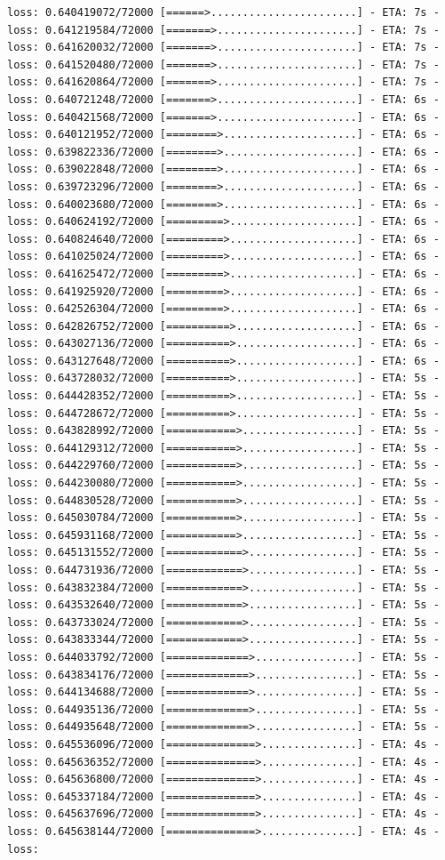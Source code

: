 \documentclass[12pt,fleqn]{article}\usepackage{../../common}
\begin{document}
\begin{verbatim}
loss: 0.640419072/72000 [======>.......................] - ETA: 7s - loss: 0.641219584/72000 [=======>......................] - ETA: 7s - loss: 0.641620032/72000 [=======>......................] - ETA: 7s - loss: 0.641520480/72000 [=======>......................] - ETA: 7s - loss: 0.641620864/72000 [=======>......................] - ETA: 7s - loss: 0.640721248/72000 [=======>......................] - ETA: 6s - loss: 0.640421568/72000 [=======>......................] - ETA: 6s - loss: 0.640121952/72000 [========>.....................] - ETA: 6s - loss: 0.639822336/72000 [========>.....................] - ETA: 6s - loss: 0.639022848/72000 [========>.....................] - ETA: 6s - loss: 0.639723296/72000 [========>.....................] - ETA: 6s - loss: 0.640023680/72000 [========>.....................] - ETA: 6s - loss: 0.640624192/72000 [=========>....................] - ETA: 6s - loss: 0.640824640/72000 [=========>....................] - ETA: 6s - loss: 0.641025024/72000 [=========>....................] - ETA: 6s - loss: 0.641625472/72000 [=========>....................] - ETA: 6s - loss: 0.641925920/72000 [=========>....................] - ETA: 6s - loss: 0.642526304/72000 [=========>....................] - ETA: 6s - loss: 0.642826752/72000 [==========>...................] - ETA: 6s - loss: 0.643027136/72000 [==========>...................] - ETA: 6s - loss: 0.643127648/72000 [==========>...................] - ETA: 6s - loss: 0.643728032/72000 [==========>...................] - ETA: 5s - loss: 0.644428352/72000 [==========>...................] - ETA: 5s - loss: 0.644728672/72000 [==========>...................] - ETA: 5s - loss: 0.643828992/72000 [===========>..................] - ETA: 5s - loss: 0.644129312/72000 [===========>..................] - ETA: 5s - loss: 0.644229760/72000 [===========>..................] - ETA: 5s - loss: 0.644230080/72000 [===========>..................] - ETA: 5s - loss: 0.644830528/72000 [===========>..................] - ETA: 5s - loss: 0.645030784/72000 [===========>..................] - ETA: 5s - loss: 0.645931168/72000 [===========>..................] - ETA: 5s - loss: 0.645131552/72000 [============>.................] - ETA: 5s - loss: 0.644731936/72000 [============>.................] - ETA: 5s - loss: 0.643832384/72000 [============>.................] - ETA: 5s - loss: 0.643532640/72000 [============>.................] - ETA: 5s - loss: 0.643733024/72000 [============>.................] - ETA: 5s - loss: 0.643833344/72000 [============>.................] - ETA: 5s - loss: 0.644033792/72000 [=============>................] - ETA: 5s - loss: 0.643834176/72000 [=============>................] - ETA: 5s - loss: 0.644134688/72000 [=============>................] - ETA: 5s - loss: 0.644935136/72000 [=============>................] - ETA: 5s - loss: 0.644935648/72000 [=============>................] - ETA: 5s - loss: 0.645536096/72000 [==============>...............] - ETA: 4s - loss: 0.645636352/72000 [==============>...............] - ETA: 4s - loss: 0.645636800/72000 [==============>...............] - ETA: 4s - loss: 0.645337184/72000 [==============>...............] - ETA: 4s - loss: 0.645637696/72000 [==============>...............] - ETA: 4s - loss: 0.645638144/72000 [==============>...............] - ETA: 4s - loss: 
\end{verbatim}
\end{document}
